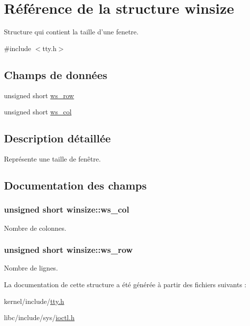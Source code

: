 \hypertarget{structwinsize}{\section{Référence de la structure winsize}
\label{structwinsize}
}


Structure qui contient la taille d'une fenetre.  




{\ttfamily \#include $<$tty.\+h$>$}

\subsection*{Champs de données}
\begin{DoxyCompactItemize}
\item 
unsigned short \hyperlink{structwinsize_a73698fa1d966374b0701e4bf225f0141}{ws\+\_\+row}
\item 
unsigned short \hyperlink{structwinsize_a80bedf71a49fd324e0d92d0702cc7005}{ws\+\_\+col}
\end{DoxyCompactItemize}


\subsection{Description détaillée}
Représente une taille de fenêtre. 

\subsection{Documentation des champs}
\hypertarget{structwinsize_a80bedf71a49fd324e0d92d0702cc7005}{
\subsubsection[{ws\+\_\+col}]{\setlength{\rightskip}{0pt plus 5cm}unsigned short winsize\+::ws\+\_\+col}}\label{structwinsize_a80bedf71a49fd324e0d92d0702cc7005}
Nombre de colonnes. \hypertarget{structwinsize_a73698fa1d966374b0701e4bf225f0141}{
\subsubsection[{ws\+\_\+row}]{\setlength{\rightskip}{0pt plus 5cm}unsigned short winsize\+::ws\+\_\+row}}\label{structwinsize_a73698fa1d966374b0701e4bf225f0141}
Nombre de lignes. 

La documentation de cette structure a été générée à partir des fichiers suivants \+:\begin{DoxyCompactItemize}
\item 
kernel/include/\hyperlink{tty_8h}{tty.\+h}\item 
libc/include/sys/\hyperlink{ioctl_8h}{ioctl.\+h}\end{DoxyCompactItemize}
